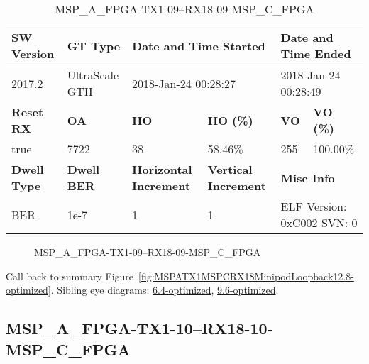 \begin{table}[h]
\centering
\caption{MSP\_A\_FPGA-TX1-09--RX18-09-MSP\_C\_FPGA}
\label{tab:MSPAFPGATX109RX1809MSPCFPGA12.8-optimized}
\begin{tabular}{@{}|l|l|l|l|l|l|@{}}
\toprule
\textbf{SW Version}                & \textbf{GT Type}   & \multicolumn{2}{l|}{\textbf{Date and Time Started}}            & \multicolumn{2}{l|}{\textbf{Date and Time Ended}}        \\ \midrule
2017.2                       & UltraScale GTH          & \multicolumn{2}{l|}{2018-Jan-24 00:28:27}                   & \multicolumn{2}{l|}{2018-Jan-24 00:28:49}               \\ \midrule
\textbf{Reset RX}                  & \textbf{OA} & \textbf{HO}   & \textbf{HO (\%)} & \textbf{VO} & \textbf{VO (\%)} \\ \midrule
true & 7722        & 38          & 58.46\%        & 255        & 100.00\%       \\ \midrule
\textbf{Dwell Type}                & \textbf{Dwell BER} & \textbf{Horizontal Increment} & \textbf{Vertical Increment}    & \multicolumn{2}{l|}{\textbf{Misc Info}}                  \\ \midrule
BER                            & 1e-7        & 1        & 1           & \multicolumn{2}{l|}{ELF Version: 0xC002 SVN: 0}                         \\ \bottomrule
\end{tabular}
\end{table}

\begin{figure}[h]
\caption{MSP\_A\_FPGA-TX1-09--RX18-09-MSP\_C\_FPGA} \label{fig:MSPAFPGATX109RX1809MSPCFPGA12.8-optimized}
\end{figure}

Call back to summary Figure~\ref{fig:MSPATX1MSPCRX18MinipodLoopback12.8-optimized}.
Sibling eye diagrams: \hyperref[sec:MSPAFPGATX109RX1809MSPCFPGA6.4-optimized]{6.4-optimized}, \hyperref[sec:MSPAFPGATX109RX1809MSPCFPGA9.6-optimized]{9.6-optimized}.

\clearpage
\newpage


\subsection{MSP\_A\_FPGA-TX1-10--RX18-10-MSP\_C\_FPGA}\label{sec:MSPAFPGATX110RX1810MSPCFPGA12.8-optimized}

